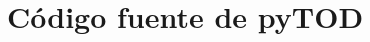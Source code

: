 \documentclass[12pt,legalpaper]{report}
\begin{document}
\begin{thebibliography}{30}





\end{thebibliography}

\appendix
\appendixpage
\addappheadtotoc
\pagebreak
\chapter{Código fuente de pyTOD}
\end{document}

